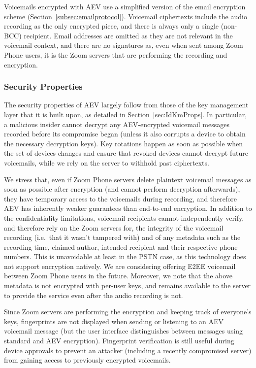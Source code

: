 Voicemails encrypted with AEV use a simplified version of the email encryption scheme
(Section~\ref{subsec:emailprotocol}). Voicemail ciphertexts include the audio recording as the only
encrypted piece, and there is always only a single (non-BCC) recipient. Email addresses are omitted
as they are not relevant in the voicemail context, and there are no signatures as, even when sent
among Zoom Phone users, it is the Zoom servers that are performing the recording and encryption.

\subsubsection{Security Properties}
The security properties of AEV largely follow from those of the key management layer that it is
built upon, as detailed in Section~\ref{sec:IdKmProps}. In particular, a malicious insider cannot
decrypt any AEV-encrypted voicemail messages recorded before its compromise began (unless it also
corrupts a device to obtain the necessary decryption keys). Key rotations happen as soon as possible
when the set of devices changes and ensure that revoked devices cannot decrypt future voicemails,
while we rely on the server to withhold past ciphertexts.

We stress that, even if Zoom Phone servers delete plaintext voicemail messages as soon as possible
after encryption (and cannot perform decryption afterwards), they have temporary access to the
voicemails during recording, and therefore AEV has inherently weaker guarantees than end-to-end
encryption. In addition to the confidentiality limitations, voicemail recipients cannot
independently verify, and therefore rely on the Zoom servers for, the integrity of the voicemail
recording (i.e.\ that it wasn't tampered with) and of any metadata such as the recording time,
claimed author, intended recipient and their respective phone numbers. This is unavoidable at least
in the PSTN case, as this technology does not support encryption natively. We are considering
offering E2EE voicemail between Zoom Phone users in the future. Moreover, we note that the above
metadata is not encrypted with per-user keys, and remains available to the server to provide the
service even after the audio recording is not.

Since Zoom servers are performing the encryption and keeping track of everyone's keys, fingerprints
are not displayed when sending or listening to an AEV voicemail message (but the user interface
distinguishes between messages using standard and AEV encryption). Fingerprint verification is still
useful during device approvals to prevent an attacker (including a recently compromised server) from
gaining access to previously encrypted voicemails.
